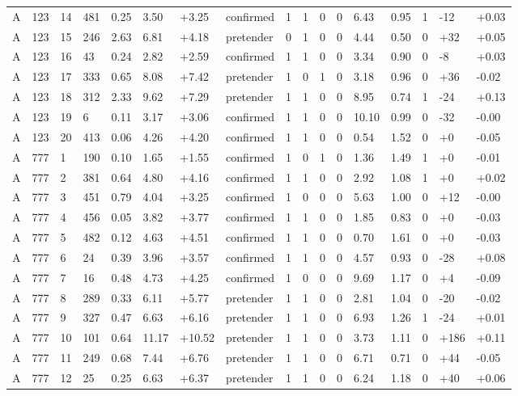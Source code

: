 \documentclass[11pt,a4paper]{article}
\begin{document}
{\begin{longtable}[]{@{}lllllllllllllllll@{}}
A & 123 & 14 & 481 & 0.25 & 3.50 & +3.25 & confirmed & 1 & 1 & 0 & 0 & 6.43 & 0.95 & 1 & -12 & +0.03 \\
A & 123 & 15 & 246 & 2.63 & 6.81 & +4.18 & pretender & 0 & 1 & 0 & 0 & 4.44 & 0.50 & 0 & +32 & +0.05 \\
A & 123 & 16 & 43 & 0.24 & 2.82 & +2.59 & confirmed & 1 & 1 & 0 & 0 & 3.34 & 0.90 & 0 & -8 & +0.03 \\
A & 123 & 17 & 333 & 0.65 & 8.08 & +7.42 & pretender & 1 & 0 & 1 & 0 & 3.18 & 0.96 & 0 & +36 & -0.02 \\
A & 123 & 18 & 312 & 2.33 & 9.62 & +7.29 & pretender & 1 & 1 & 0 & 0 & 8.95 & 0.74 & 1 & -24 & +0.13 \\
A & 123 & 19 & 6 & 0.11 & 3.17 & +3.06 & confirmed & 1 & 1 & 0 & 0 & 10.10 & 0.99 & 0 & -32 & -0.00 \\
A & 123 & 20 & 413 & 0.06 & 4.26 & +4.20 & confirmed & 1 & 1 & 0 & 0 & 0.54 & 1.52 & 0 & +0 & -0.05 \\
A & 777 & 1 & 190 & 0.10 & 1.65 & +1.55 & confirmed & 1 & 0 & 1 & 0 & 1.36 & 1.49 & 1 & +0 & -0.01 \\
A & 777 & 2 & 381 & 0.64 & 4.80 & +4.16 & confirmed & 1 & 1 & 0 & 0 & 2.92 & 1.08 & 1 & +0 & +0.02 \\
A & 777 & 3 & 451 & 0.79 & 4.04 & +3.25 & confirmed & 1 & 0 & 0 & 0 & 5.63 & 1.00 & 0 & +12 & -0.00 \\
A & 777 & 4 & 456 & 0.05 & 3.82 & +3.77 & confirmed & 1 & 1 & 0 & 0 & 1.85 & 0.83 & 0 & +0 & -0.03 \\
A & 777 & 5 & 482 & 0.12 & 4.63 & +4.51 & confirmed & 1 & 1 & 0 & 0 & 0.70 & 1.61 & 0 & +0 & -0.03 \\
A & 777 & 6 & 24 & 0.39 & 3.96 & +3.57 & confirmed & 1 & 1 & 0 & 0 & 4.57 & 0.93 & 0 & -28 & +0.08 \\
A & 777 & 7 & 16 & 0.48 & 4.73 & +4.25 & confirmed & 1 & 0 & 0 & 0 & 9.69 & 1.17 & 0 & +4 & -0.09 \\
A & 777 & 8 & 289 & 0.33 & 6.11 & +5.77 & pretender & 1 & 1 & 0 & 0 & 2.81 & 1.04 & 0 & -20 & -0.02 \\
A & 777 & 9 & 327 & 0.47 & 6.63 & +6.16 & pretender & 1 & 1 & 0 & 0 & 6.93 & 1.26 & 1 & -24 & +0.01 \\
A & 777 & 10 & 101 & 0.64 & 11.17 & +10.52 & pretender & 1 & 1 & 0 & 0 & 3.73 & 1.11 & 0 & +186 & +0.11 \\
A & 777 & 11 & 249 & 0.68 & 7.44 & +6.76 & pretender & 1 & 1 & 0 & 0 & 6.71 & 0.71 & 0 & +44 & -0.05 \\
A & 777 & 12 & 25 & 0.25 & 6.63 & +6.37 & pretender & 1 & 1 & 0 & 0 & 6.24 & 1.18 & 0 & +40 & +0.06 \\

\end{longtable}}
\end{document}
